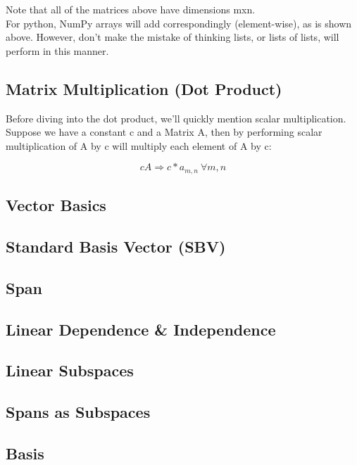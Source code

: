 Note that all of the matrices above have dimensions mxn.
\\

For python, NumPy arrays will add correspondingly (element-wise), as is shown above. However, don't make the mistake of thinking lists, or lists of lists, will perform in this manner.

\subsection{Matrix Multiplication (Dot Product)}\label{concept1.3}
Before diving into the dot product, we'll quickly mention scalar multiplication. Suppose we have a constant c and a Matrix A, then by performing scalar multiplication of A by c will multiply each element of A by c:

\begin{equation}
	cA \Longrightarrow c*a_{m, n} \: \forall m, n
\end{equation}



\subsection{Vector Basics}\label{concept1.4}

\subsection{Standard Basis Vector (SBV)}\label{concept1.5}

\subsection{Span}\label{concept1.6}

\subsection{Linear Dependence \& Independence}\label{concept1.7}

\subsection{Linear Subspaces}\label{concept1.8}

\subsection{Spans as Subspaces}\label{concept1.9}

\subsection{Basis}\label{concept1.10}

